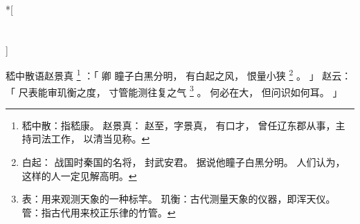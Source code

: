 
\switchcolumn[0]*[\section{}]

嵇中散语赵景真%
\footnote{%
    嵇中散：指嵇康。
    赵景真：
        赵至，字景真，
        有口才，
        曾任辽东郡从事，主持司法工作，
        以清当见称。
}%
：「
    卿
    瞳子白黑分明，
    有白起之风，
    恨量小狭%
    \footnote{%
        白起：
            战国时秦国的名将，
            封武安君。
            据说他瞳子白黑分明。
            人们认为，
            这样的人一定见解高明。
    }%
    。
」
赵云：「
    尺表能审玑衡之度，
    寸管能测往复之气%
    \footnote{%
        表：用来观测天象的一种标竿。
        玑衡：古代测量天象的仪器，即浑天仪。
        管：指古代用来校正乐律的竹管。
    }%
    。
    何必在大，
    但问识如何耳。
」

\switchcolumn


